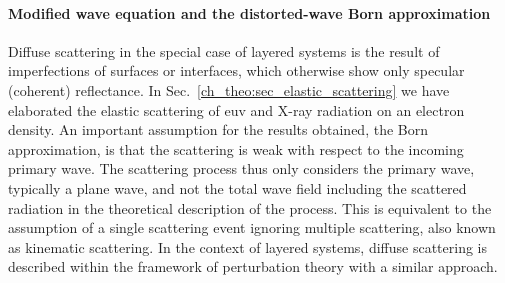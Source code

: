 \paragraph{Modified wave equation and the distorted-wave Born approximation}
Diffuse scattering in the special case of layered systems is the result of imperfections of surfaces or interfaces, which otherwise show only specular (coherent) reflectance. In Sec.~\ref{ch_theo:sec_elastic_scattering} we have elaborated the elastic scattering of \gls{euv} and X-ray radiation on an electron density. An important assumption for the results obtained, the Born approximation, is that the scattering is weak with respect to the incoming primary wave. The scattering process thus only considers the primary wave, typically a plane wave, and not the total wave field including the scattered radiation in the theoretical description of the process. This is equivalent to the assumption of a single scattering event ignoring multiple scattering, also known as kinematic scattering. In the context of layered systems, diffuse scattering is described within the framework of perturbation theory with a similar approach.

